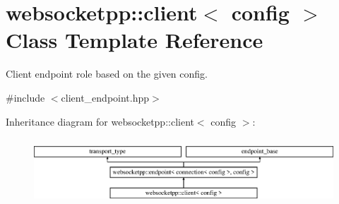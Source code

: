\hypertarget{classwebsocketpp_1_1client}{}\section{websocketpp\+:\+:client$<$ config $>$ Class Template Reference}
\label{classwebsocketpp_1_1client}


Client endpoint role based on the given config.  




{\ttfamily \#include $<$client\+\_\+endpoint.\+hpp$>$}

Inheritance diagram for websocketpp\+:\+:client$<$ config $>$\+:\begin{figure}[H]
\begin{center}
\leavevmode
\includegraphics[height=2.500000cm]{classwebsocketpp_1_1client}
\end{center}
\end{figure}
